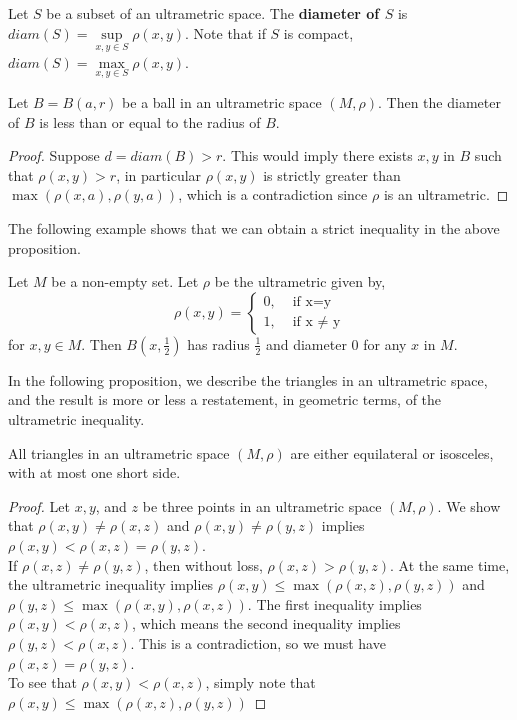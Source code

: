 \begin{definition}
Let $S$ be a subset of an ultrametric space. The \textbf{diameter of $S$} is $diam(S) = \sup\limits_{x,y\in S}\rho(x,y)$. Note that if $S$ is compact, $diam(S) = \max\limits_{x,y\in S}\rho(x,y)$.
\end{definition}

\begin{proposition}
	Let $B=B(a, r)$ be a ball in an ultrametric space $(M,\rho)$. Then the diameter of $B$ is less than or equal to the radius of $B$.    
\end{proposition}

\begin{proof}
Suppose $d = diam(B) > r$. This would imply there exists $x,y$ in $B$ such that $\rho(x,y) > r$, in particular $\rho(x,y)$ is strictly greater than $\max(\rho(x,a), \rho(y,a))$, which is a contradiction since $\rho$ is an ultrametric.
\end{proof}
 
The following example shows that we can obtain a strict inequality in the above proposition.

\begin{example}
	Let $M$ be a non-empty set. Let $\rho$ be the ultrametric given by, 
	\[
	\rho(x,y) = 
	\begin{cases}
		0, & \text{ if x=y} \\
		1, & \text{ if x } \neq \text{ y}
	\end{cases}
	\]
for $x,y \in M$. Then $B(x, \frac{1}{2})$ has radius $\frac{1}{2}$ and diameter $0$ for any $x$ in $M$.
\end{example}

In the following proposition, we describe the triangles in an ultrametric space, and the result is more or less a restatement, in geometric terms, of the ultrametric inequality.\\

\begin{proposition}
	 All triangles in an ultrametric space $(M,\rho)$ are either equilateral or isosceles, with at most one short side. 
\end{proposition}

\begin{proof}
Let $x,y$, and $z$ be three points in an ultrametric space $(M,\rho)$. We show that $\rho(x,y) \neq \rho(x,z)$ and $\rho(x,y) \neq \rho(y,z)$ implies $\rho(x,y) < \rho(x,z) = \rho(y,z)$.\\

If $\rho(x,z) \neq \rho(y,z)$, then without loss, $\rho(x,z) > \rho(y,z)$. At the same time, the ultrametric inequality implies $\rho(x,y) \leq \max(\rho(x,z), \rho(y,z))$ and  $\rho(y,z) \leq \max(\rho(x,y), \rho(x,z))$. The first inequality implies $\rho(x,y) < \rho(x,z)$, which means the second inequality implies $\rho(y,z) < \rho(x,z)$. This is a contradiction, so we must have $\rho(x,z) = \rho(y,z)$.\\

To see that $\rho(x,y) < \rho(x,z)$, simply note that $\rho(x,y) \leq \max(\rho(x,z), \rho(y,z))$
\end{proof}


